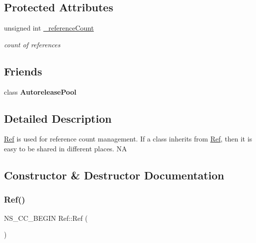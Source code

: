 \subsection*{Protected Attributes}
\begin{DoxyCompactItemize}
\item 
\mbox{\label{classRef_ab05a4c4ef09ecbaffc7c7c7f57d34bf6}} 
unsigned int \hyperlink{classRef_ab05a4c4ef09ecbaffc7c7c7f57d34bf6}{\+\_\+reference\+Count}
\begin{DoxyCompactList}\small\item\em count of references \end{DoxyCompactList}\end{DoxyCompactItemize}
\subsection*{Friends}
\begin{DoxyCompactItemize}
\item 
\mbox{\label{classRef_a15f8a5c8b44c246c488357f157541d52}} 
class {\bfseries Autorelease\+Pool}
\end{DoxyCompactItemize}


\subsection{Detailed Description}
\hyperlink{classRef}{Ref} is used for reference count management. If a class inherits from \hyperlink{classRef}{Ref}, then it is easy to be shared in different places.  NA 

\subsection{Constructor \& Destructor Documentation}
\mbox{\label{classRef_ab9cf238c39cc7fc6ffde82c8d94c465e}} 
\subsubsection{\texorpdfstring{Ref()}{Ref()}\hspace{0.1cm}{\footnotesize\ttfamily [1/2]}}
{\footnotesize\ttfamily N\+S\+\_\+\+C\+C\+\_\+\+B\+E\+G\+IN Ref\+::\+Ref (\begin{DoxyParamCaption}{ }\end{DoxyParamCaption})\hspace{0.3cm}{\ttfamily [protected]}}

